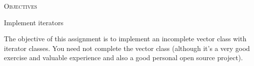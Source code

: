 

\renewcommand\AUTHOR{jdoe5@cougars.ccis.edu} %


\topmattertwo

\textsc{Objectives}
\begin{tightlist}
\item Implement iterators
\end{tightlist}

The objective of this assignment is to implement an incomplete vector class
with iterator classes.
You need not complete the vector class (although it's a very good
exercise and valuable experience and also a good personal open source
project).

\newpage
\nextq

\newpage


